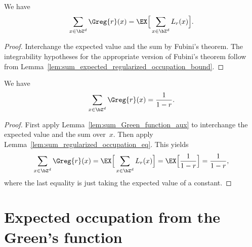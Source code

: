 \begin{lemma}
  \label{lem:sum_Green_function_aux}
  We have
  \begin{align*}
    \sum_{x \in \bZ^d} \Greg{r}(x) = \EX \Big[ \sum_{x \in \bZ^d} L_r(x) \Big] .
  \end{align*}
\end{lemma}
\begin{proof}
  Interchange the expected value and the sum by Fubini's theorem.
  The integrability hypotheses for the appropriate version of Fubini's theorem
  follow from Lemma~\ref{lem:sum_expected_regularized_occupation_bound}.
\end{proof}

\begin{lemma}
  \label{lem:sum_Green_function}
  We have
  \begin{align*}
    \sum_{x \in \bZ^d} \Greg{r}(x) = \frac{1}{1-r} .
  \end{align*}
\end{lemma}
\begin{proof}
  First apply Lemma~\ref{lem:sum_Green_function_aux} to interchange the expected value
  and the sum over~$x$. Then apply Lemma~\ref{lem:sum_regularized_occupation_eq}.
  This yields
  \begin{align*}
    \sum_{x \in \bZ^d} \Greg{r}(x) = \EX \Big[ \sum_{x \in \bZ^d} L_r(x) \Big]
    = \EX \Big[ \frac{1}{1-r} \Big] = \frac{1}{1-r} ,
  \end{align*}
  where the last equality is just taking the expected value of a constant.
\end{proof}



\section{Expected occupation from the Green's function}

